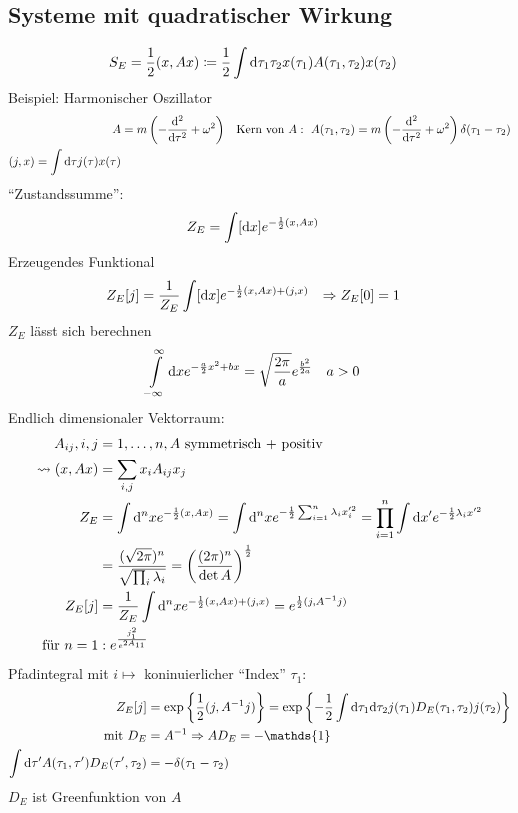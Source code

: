 \subsection{Systeme mit quadratischer Wirkung}
	\begin{align*}
		S_E &= \frac{1}{2} (x, Ax) \coloneqq
		\frac{1}{2} \int \mathrm{d} \tau_1 \tau_2 x(\tau_1) A(\tau_1, \tau_2) x(\tau_2)
	\end{align*}
Beispiel: Harmonischer Oszillator
	\begin{align*}
		A &= m \left(-\frac{\mathrm{d}^2}{\mathrm{d} \tau^2} + \omega^2\right) & 
		\text{Kern von }A:~ A(\tau_1, \tau_2) &= m \left(-\frac{\mathrm{d}^2}{\mathrm{d} \tau^2} + \omega^2\right) \delta(\tau_1 - \tau_2) \\
		(j, x) = \int \mathrm{d} \tau j(\tau) x(\tau) 
	\end{align*}
``Zustandssumme'': 
	\begin{align*}
		Z_E &= \int [\mathrm{d} x] e^{-\frac{1}{2} (x, Ax)} 
	\end{align*}
Erzeugendes Funktional
	\begin{align*}
		Z_E[j] &= \frac{1}{Z_E} \int [\mathrm{d} x] e^{-\frac{1}{2} (x, Ax) + (j,x)} 
		&\Rightarrow Z_E[0] &= 1 
	\end{align*}
$Z_E$ lässt sich berechnen
	\begin{align*}
		\int \limits_{-\infty}^{\infty} \mathrm{d} x e^{-\frac{a}{2} x^2 + bx} &=
		\sqrt{\frac{2 \pi}{a}} e^{\frac{b^2}{2a}} &
		a &> 0
	\end{align*}
Endlich dimensionaler Vektorraum:
	\begin{align*}
		A_{ij} , i,j &= 1, \ldots, n, A \text{ symmetrisch + positiv} \\
		\leadsto (x, Ax) &= \sum_{i,j} x_i A_{ij} x_j \\
		Z_E &= \int \mathrm{d}^n x e^{-\frac{1}{2} (x, Ax)}
		= \int \mathrm{d}^n x e^{-\frac{1}{2} \sum_{i = 1}^{n} \lambda_i x_i'^2}
		= \prod_{i = 1}^{n} \int \mathrm{d} x' e^{-\frac{1}{2} \lambda_i x'^2} \\
		&= \frac{(\sqrt{2 \pi})^n}{\sqrt{\prod_i \lambda_i}} = 
		\left(\frac{(2 \pi)^n}{\det A}\right)^{\frac{1}{2}} \\
		Z_E [j] &= \frac{1}{Z_E} \int \mathrm{d}^n x e^{-\frac{1}{2} (x, Ax) + (j,x)} 
		= e^{\frac{1}{2} (j, A^{-1} j)} \\
		\text{für } n= 1 &: e^{\frac{j_1^2}{e^{2A_{11}}}}
	\end{align*}
Pfadintegral mit $i \mapsto$ koninuierlicher ``Index'' $\tau_1$:
	\begin{align*}
		Z_E [j] &= \exp \left\{\frac{1}{2} (j, A^{-1}j)\right\} =
		\exp \left\{-\frac{1}{2}\int \diff \tau_1 \diff \tau_2  j(\tau_1) D_E (\tau_1, \tau_2) j(\tau_2)\right\} \\
		\text{mit } D_E &= A^{-1} \Rightarrow A D_E = - \mathds{1} \\
		\int \diff \tau' A(\tau_1, \tau') D_E (\tau', \tau_2) &= -\delta (\tau_1- \tau_2)
	\end{align*}
$D_E$ ist Greenfunktion von $A$